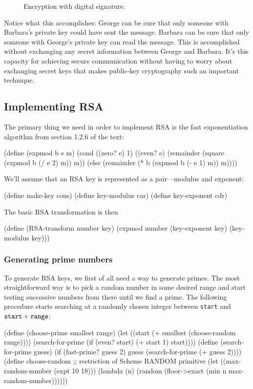 \begin{figure}
\caption {Encryption with digital signature.}
\label{digital-signature}
\end{figure}

Notice what this accomplishes: George can be sure that only someone
with Barbara's private key could have sent the message.  Barbara can
be sure that only someone with George's private key can read the
message.  This is accomplished without exchanging any secret
information between George and Barbara.  It's this capacity for
achieving secure communication without having to worry about
exchanging secret keys that makes public-key cryptography such an
important technique.


\subsection{Implementing RSA}

The primary thing we need in order to implement RSA is the fast
exponentiation algorithm from section 1.2.6 of the text:

\beginlisp
(define (expmod b e m)
  (cond ((zero? e) 1)
        ((even? e)
         (remainder (square (expmod b (/ e 2) m)) m))
        (else (remainder (* b (expmod b (- e 1) m)) m))))
\endlisp

\noindent
We'll assume that an RSA key is represented as a pair---modulus and exponent:

\beginlisp
(define make-key cons)
(define key-modulus car)
(define key-exponent cdr)
\endlisp

\noindent
The basic RSA transformation is then

\beginlisp
(define (RSA-transform number key)
  (expmod number (key-exponent key) (key-modulus key)))
\endlisp

\subsubsection{Generating prime numbers}

To generate RSA keys, we first of all need a way to generate primes.
The most straightforward way is to pick a random number in some
desired range and start testing successive numbers from there until we
find a prime.  The following procedure starts searching at a randomly
chosen integer between {\tt start} and ${\tt start}+{\tt range}$:

\beginlisp
(define (choose-prime smallest range)
  (let ((start (+ smallest (choose-random range))))
    (search-for-prime (if (even? start) (+ start 1) start))))
\null
(define (search-for-prime guess)
  (if (fast-prime? guess 2)
      guess
      (search-for-prime (+ guess 2))))
\null
(define choose-random
  ;; restriction of Scheme RANDOM primitive
  (let ((max-random-number (expt 10 18))) 
    (lambda (n)
      (random (floor->exact (min n max-random-number))))))
\endlisp

